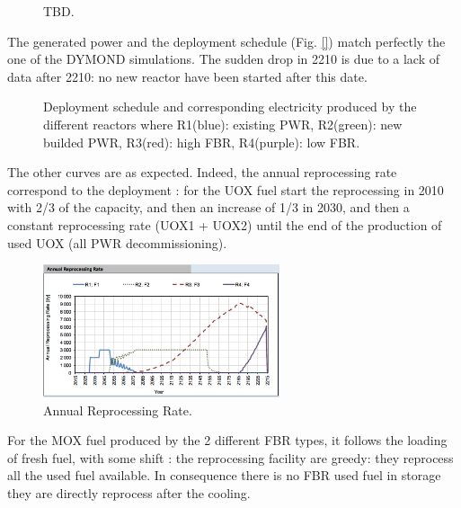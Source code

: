 \documentclass[12pt]{article}
\begin{document}
\begin{figure}[h!]
\centering
{}
\caption{TBD.\label{fig:RessourceUsed} }
\end{figure}

The generated power and the deployment schedule
(Fig. \ref{})  match perfectly the one of the
DYMOND simulations. The sudden drop in 2210 is
due to a lack of data after 2210: no new reactor
have been started after this date.\\

\begin{figure}[h!]
\centering
{}
\caption{Deployment schedule and corresponding
electricity produced by the different reactors
where R1(blue): existing PWR, R2(green): new
builded PWR, R3(red): high FBR, R4(purple): low
FBR.\label{fig:deployment_bis} }
\end{figure}


The other curves are as expected. Indeed, the
annual reprocessing rate correspond to the
deployment :  for the UOX fuel start the
reprocessing in 2010 with 2/3 of the capacity, and
then an increase of 1/3 in 2030, and then a
constant reprocessing rate (UOX1 + UOX2) until the
end of the production of used UOX (all PWR
decommissioning).


\begin{figure}[h!]
\centering
\includegraphics[width=0.62\textwidth]	{img/AnnualReprocessingRate_1}
\caption{Annual Reprocessing Rate.}
\label{fig:reprocessing_1}
\end{figure}


For the MOX fuel produced by the 2 different FBR
types, it follows the loading of fresh fuel, with
some shift : the reprocessing facility are greedy:
they reprocess all the used fuel available. In
consequence there is no FBR used fuel in storage
they are directly reprocess after the cooling.
\end{document}
